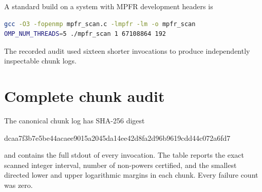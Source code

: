 \documentclass[11pt,oneside]{article}
\theoremstyle{definition}
\begin{document}
A standard build on a system with MPFR development headers is
\begin{lstlisting}[language=bash]
gcc -O3 -fopenmp mpfr_scan.c -lmpfr -lm -o mpfr_scan
OMP_NUM_THREADS=5 ./mpfr_scan 1 67108864 192
\end{lstlisting}
The recorded audit used sixteen shorter invocations to produce independently inspectable
chunk logs.

\section{Complete chunk audit}\label{app:chunk-audit}

The canonical chunk log has SHA-256 digest
\begin{center}
\small\ttfamily
dcaa7f3b7e5be44acaee9015a2045da14ee42d8fa2d96b9619cdd44c072a6fd7
\end{center}
and contains the full stdout of every invocation.  The table reports the exact scanned
integer interval, number of non-powers certified, and the smallest directed lower and upper
logarithmic margins in each chunk.  Every failure count was zero.
\end{document}
